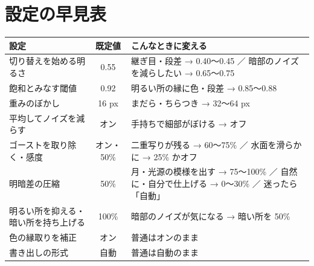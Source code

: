 \documentclass[paper=a4paper,fontsize=11pt,report,jafontsize=11pt]{jlreq}
\begin{document}
\section{設定の早見表}
\begin{center}
\begin{tabularx}{\linewidth}{l c X}
\toprule
設定 & 既定値 & こんなときに変える \\ \midrule
切り替えを始める明るさ & 0.55 & 継ぎ目・段差 → 0.40〜0.45 ／ 暗部のノイズを減らしたい → 0.65〜0.75 \\
飽和とみなす閾値 & 0.92 & 明るい所の縁に色・段差 → 0.85〜0.88 \\
重みのぼかし & 16 px & まだら・ちらつき → 32〜64 px \\
平均してノイズを減らす & オン & 手持ちで細部がぼける → オフ \\
ゴーストを取り除く・感度 & オン・50\% & 二重写りが残る → 60〜75\% ／ 水面を滑らかに → 25\% かオフ \\
明暗差の圧縮 & 50\% & 月・光源の模様を出す → 75〜100\% ／ 自然に・自分で仕上げる → 0〜30\% ／ 迷ったら「自動」 \\
明るい所を抑える・暗い所を持ち上げる & 100\% & 暗部のノイズが気になる → 暗い所を 50\% \\
色の縁取りを補正 & オン & 普通はオンのまま \\
書き出しの形式 & 自動 & 普通は自動のまま \\
\bottomrule
\end{tabularx}
\end{center}
\end{document}
